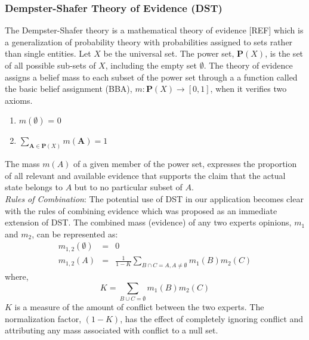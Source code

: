\documentclass[times, 10pt,twocolumn]{article}
\begin{document}
\subsubsection{Dempster-Shafer Theory of Evidence (DST)}\label{DST}
The Dempster-Shafer theory is a mathematical theory of evidence
[REF] which is a generalization of probability theory with
probabilities assigned to sets rather than single entities. Let $X$
be the universal set. The power set, $\mathbf{P}(X)$, is the set of
all possible sub-sets of $X$, including the empty set $\emptyset$.
The theory of evidence assigns a belief mass to each subset of the
power set through a  a function called the basic belief assignment
(BBA), $m:\mathbf{P}(X) \rightarrow [0,1]$, when it verifies two
axioms.
\begin{enumerate}
\item $m(\emptyset)$ = 0
\item $\sum\limits_{\mathbf{A} \in \mathbf{P}(X)} m(\mathbf{A})= 1$
\end{enumerate}
The mass $m(A)$ of a given member of the power set, expresses the
proportion of all relevant and available evidence that supports the
claim that the actual state belongs to $A$ but to no particular
subset of $A$. \\
{\em Rules of Combination}: The potential use of DST in our
application becomes clear with the rules of combining evidence which
was proposed as an immediate extension of DST. The combined mass
(evidence) of any two experts opinions, $m_1$ and $m_2$, can be
represented as:
\begin{eqnarray}
m_{1,2}(\emptyset) & = &  0 \\
m_{1,2}(A)& =  & \frac{1}{1-K}\sum\limits_{B\cap C = A, A \ne
\emptyset}m_1(B) m_2(C) \label{Eqn:16}
\end{eqnarray}
where,
\begin{equation}
K = \sum\limits_{B \cup C = \emptyset}m_1(B) m_2(C) \label{Eqn:17}
\end{equation}
$K$ is a measure of the amount of conflict between the two experts.
The normalization factor, $(1-K)$, has the effect of completely
ignoring conflict and attributing any mass associated with conflict
to a null set.
\end{document}
